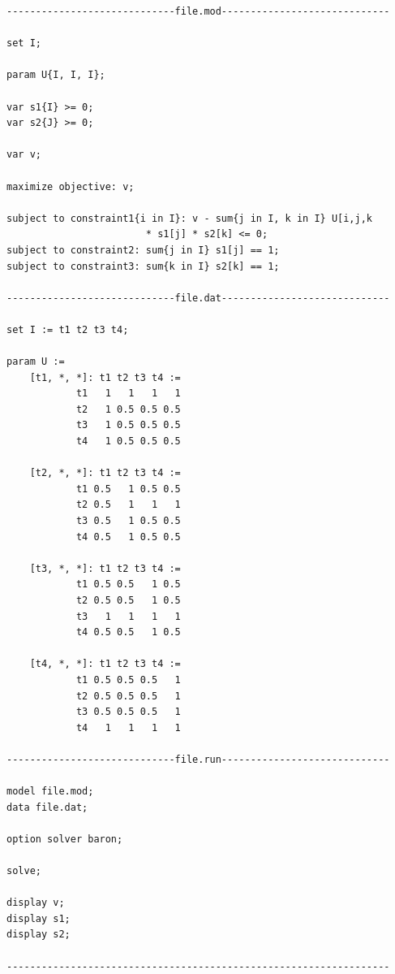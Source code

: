 \begin{verbatim}
-----------------------------file.mod-----------------------------

set I;

param U{I, I, I};

var s1{I} >= 0;
var s2{J} >= 0;

var v;

maximize objective: v;

subject to constraint1{i in I}: v - sum{j in I, k in I} U[i,j,k
                        * s1[j] * s2[k] <= 0;
subject to constraint2: sum{j in I} s1[j] == 1;
subject to constraint3: sum{k in I} s2[k] == 1;

-----------------------------file.dat-----------------------------

set I := t1 t2 t3 t4;

param U :=
    [t1, *, *]: t1 t2 t3 t4 :=
	        t1   1   1   1   1
	        t2   1 0.5 0.5 0.5
	        t3   1 0.5 0.5 0.5
	        t4   1 0.5 0.5 0.5

    [t2, *, *]: t1 t2 t3 t4 :=
	        t1 0.5   1 0.5 0.5
	        t2 0.5   1   1   1
	        t3 0.5   1 0.5 0.5
	        t4 0.5   1 0.5 0.5
	        
    [t3, *, *]: t1 t2 t3 t4 :=
	        t1 0.5 0.5   1 0.5
	        t2 0.5 0.5   1 0.5
	        t3   1   1   1   1
	        t4 0.5 0.5   1 0.5
	        
    [t4, *, *]: t1 t2 t3 t4 :=
	        t1 0.5 0.5 0.5   1
	        t2 0.5 0.5 0.5   1
	        t3 0.5 0.5 0.5   1
	        t4   1   1   1   1
	
-----------------------------file.run-----------------------------

model file.mod;
data file.dat;

option solver baron;

solve;

display v;
display s1;
display s2;

------------------------------------------------------------------
\end{verbatim}

